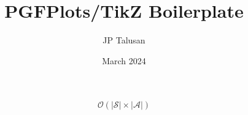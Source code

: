 \documentclass[conference]{IEEEtran}
\title{PGFPlots/TikZ Boilerplate}
\author{JP Talusan}
\date{March 2024}
\DeclareMathOperator*{\argmaxA}{arg\,max} %
\DeclareMathOperator*{\maxA}{max} %
\begin{document}
\maketitle


































\begin{equation}
    \mathcal{O}(|\mathcal{S}| \times |\mathcal{A}|)
\end{equation}


% 








\end{document}
